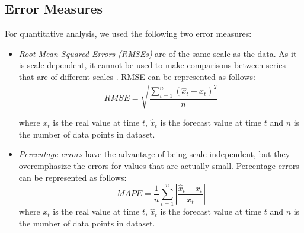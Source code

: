 \subsection{Error Measures}
For quantitative analysis, we used the following two error measures:

\begin{itemize}
\item \textit{Root Mean Squared Errors (RMSEs)} are of the same scale as the data. As it is scale dependent, it cannot be used to make comparisons between series that are of different scales \cite{Forecasting_OTexts}. RMSE can be represented as follows:
$$RMSE=\sqrt{\frac{\sum_{t=1}^{n}(\hat{x}_{t}-x_{t})^{2}}{n}}$$

where $x_{t}$ is the real value at time $t$,  $\hat{x}_{t}$ is the forecast value at time $t$ and $n$ is the number of data points in dataset.

\item \textit{Percentage errors} have the advantage of being scale-independent, but they overemphasize the errors for values that are actually small. Percentage errors can be represented as follows:
$$MAPE=\frac{1}{n}\sum_{t=1}^{n}\left | \frac{\hat{x}_{t}-x_{t}}{x_{t}} \right |$$
where $x_{t}$ is the real value at time $t$,  $\hat{x}_{t}$ is the forecast value at time $t$ and $n$ is the number of data points in dataset.

\end{itemize}